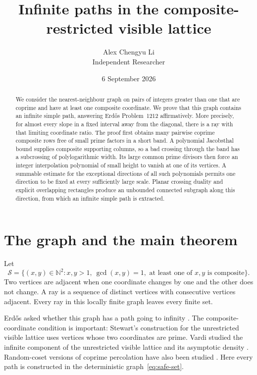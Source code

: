 \documentclass[11pt]{article}
\title{Infinite paths in the composite-restricted visible lattice}
\author{Alex Chengyu Li\\\small Independent Researcher}
\date{6 September 2026}
\theoremstyle{definition}
\theoremstyle{remark}
\newcommand{\NN}{\mathbb N}
\newcommand{\cS}{\mathcal S}
\begin{document}
\maketitle
\begin{abstract}
We consider the nearest-neighbour graph on pairs of integers greater than
one that are coprime and have at least one composite coordinate. We prove
that this graph contains an infinite simple path, answering Erd\H{o}s
Problem~1212 affirmatively. More precisely, for almost every slope in a
fixed interval away from the diagonal, there is a ray with that limiting
coordinate ratio. The proof first obtains many pairwise coprime composite
rows free of small prime factors in a short band. A polynomial Jacobsthal bound supplies
composite supporting columns, so a bad crossing through the band has a
subcrossing of polylogarithmic width. Its large common prime divisors then
force an integer interpolation polynomial of small height to vanish at
one of its vertices. A summable estimate for the exceptional directions of
all such polynomials permits one direction to be fixed at every sufficiently
large scale. Planar crossing duality and explicit overlapping rectangles
produce an unbounded connected subgraph along this direction, from which
an infinite simple path is extracted.
\end{abstract}

\section{The graph and the main theorem}

Let
\begin{equation}\label{eq:safe-set}
 \cS=\{(x,y)\in\NN^2:x,y>1,\ \gcd(x,y)=1,
                 \text{ at least one of }x,y\text{ is composite}\}.
\end{equation}
Two vertices are adjacent when one coordinate changes by one and the other
does not change. A ray is a sequence of distinct vertices with consecutive
vertices adjacent. Every ray in this locally finite graph leaves every
finite set.

Erd\H{o}s asked whether this graph has a path going to infinity
\cite[p.~114]{Erdos1980}. The composite-coordinate condition is important:
Stewart's construction for the unrestricted visible lattice uses vertices
whose two coordinates are prime. Vardi studied the infinite component of
the unrestricted visible lattice and its asymptotic density \cite{Vardi1999}.
Random-coset versions of coprime percolation have also been studied
\cite{LeFournLiuMartineau2025}. Here every path is constructed in the
deterministic graph~\eqref{eq:safe-set}.
\end{document}
